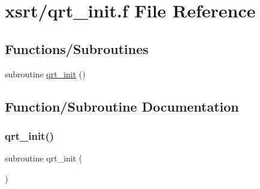 \hypertarget{qrt__init_8f}{}\section{xsrt/qrt\+\_\+init.f File Reference}
\label{qrt__init_8f}
\subsection*{Functions/\+Subroutines}
\begin{DoxyCompactItemize}
\item 
subroutine \hyperlink{qrt__init_8f_af5a9400cfc5af2c2d55dd6bfcf838824}{qrt\+\_\+init} ()
\end{DoxyCompactItemize}


\subsection{Function/\+Subroutine Documentation}
\mbox{\label{qrt__init_8f_af5a9400cfc5af2c2d55dd6bfcf838824}} 
\subsubsection{\texorpdfstring{qrt\+\_\+init()}{qrt\_init()}}
{\footnotesize\ttfamily subroutine qrt\+\_\+init (\begin{DoxyParamCaption}{ }\end{DoxyParamCaption})}

